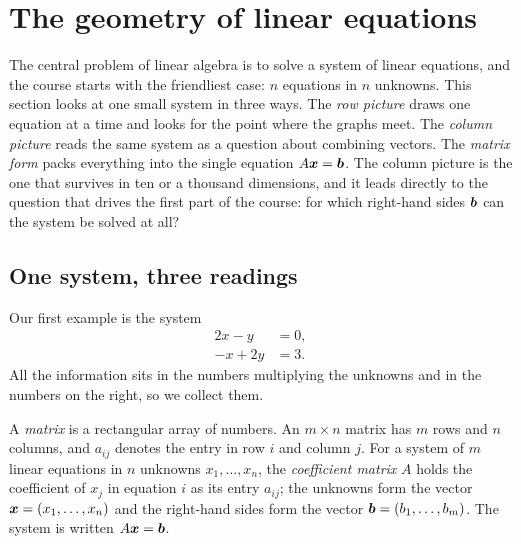 \section{The geometry of linear equations}\label{sec:u01}

The central problem of linear algebra is to solve a system of linear equations, and the
course starts with the friendliest case: $n$ equations in $n$ unknowns. This section looks
at one small system in three ways. The \emph{row picture} draws one equation at a time and
looks for the point where the graphs meet. The \emph{column picture} reads the same system
as a question about combining vectors. The \emph{matrix form} packs everything into the
single equation $A\vb{x}=\vb{b}$. The column picture is the one that survives in ten or a
thousand dimensions, and it leads directly to the question that drives the first part of the
course: for which right-hand sides $\boldsymbol{b}$ can the system be solved at all?

\subsection{One system, three readings}

Our first example is the system
\begin{equation}\label{eq:u01-system}
\begin{aligned}
  2x - y &= 0,\\
  -x + 2y &= 3 .
\end{aligned}
\end{equation}
All the information sits in the numbers multiplying the unknowns and in the numbers on the
right, so we collect them.

\begin{definition}[Matrix, coefficient matrix, $A\vb{x}=\vb{b}$]\label{def:u01-matrix}
A \emph{matrix} is a rectangular array of numbers. An $m\times n$ matrix has $m$ rows and
$n$ columns, and $a_{ij}$ denotes the entry in row $i$ and column $j$. For a system of $m$
linear equations in $n$ unknowns $x_1,\dots,x_n$, the \emph{coefficient matrix} $A$ holds
the coefficient of $x_j$ in equation $i$ as its entry $a_{ij}$; the unknowns form the vector
$\boldsymbol{x}=(x_1,\dots,x_n)$ and the right-hand sides form the vector $\boldsymbol{b}=(b_1,\dots,b_m)$.
The system is written $A\vb{x}=\vb{b}$.
\end{definition}

